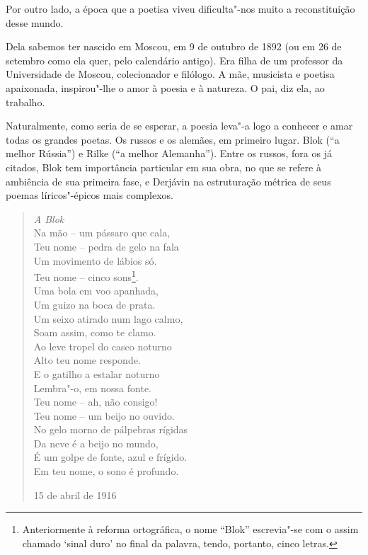 Por outro lado, a época que a poetisa viveu dificulta"-nos muito a
reconstituição desse mundo.

Dela sabemos ter nascido em Moscou, em 9 de outubro de 1892 (ou em 26 de
setembro como ela quer, pelo calendário antigo). Era filha de um
professor da Universidade de Moscou, colecionador e filólogo. A mãe,
musicista e poetisa apaixonada, inspirou"-lhe o amor à poesia e à
natureza. O pai, diz ela, ao trabalho.

Naturalmente, como seria de se esperar, a poesia leva"-a logo a conhecer
e amar todas os grandes poetas. Os russos e os alemães, em primeiro
lugar. Blok (``a melhor Rússia'') e Rilke (``a melhor Alemanha''). Entre
os russos, fora os já citados, Blok tem importância particular em sua
obra, no que se refere à ambiência de sua primeira fase, e Derjávin na
estruturação métrica de seus poemas líricos"-épicos mais complexos.

\begin{verse}
\emph{A Blok} \\[8pt]
Na mão -- um pássaro que cala, \\
Teu nome -- pedra de gelo na fala \\
Um movimento de lábios só. \\[8pt]
Teu nome -- cinco sons\footnote{Anteriormente à reforma ortográfica, o
  nome ``Blok'' escrevia"-se com o assim chamado `sinal duro' no final da
  palavra, tendo, portanto, cinco letras.}. \\
Uma bola em voo apanhada, \\
Um guizo na boca de prata. \\
Um seixo atirado num lago calmo, \\
Soam assim, como te clamo. \\
Ao leve tropel do casco noturno \\
Alto teu nome responde. \\
E o gatilho a estalar noturno \\
Lembra"-o, em nossa fonte. \\[8pt]
Teu nome -- ah, não consigo! \\
Teu nome -- um beijo no ouvido. \\
No gelo morno de pálpebras rígidas \\
Da neve é a beijo no mundo, \\
É um golpe de fonte, azul e frígido. \\
Em teu nome, o sono é profundo. 

15 de abril de 1916

\end{verse}

